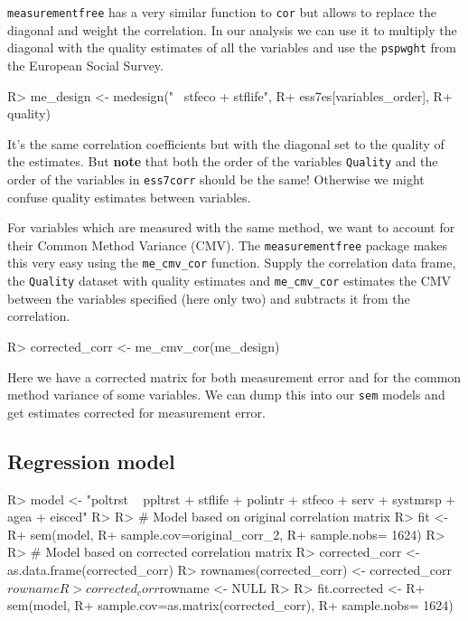 \documentclass[
]{jss}
\begin{document}
\texttt{measurementfree} has a very similar function to \texttt{cor} but
allows to replace the diagonal and weight the correlation. In our
analysis we can use it to multiply the diagonal with the quality
estimates of all the variables and use the \texttt{pspwght} from the
European Social Survey.

\begin{CodeChunk}

\begin{CodeInput}
R> me_design <- medesign("~ stfeco + stflife",
R+                       ess7es[variables_order],
R+                       quality)
\end{CodeInput}
\end{CodeChunk}

It's the same correlation coefficients but with the diagonal set to the
quality of the estimates. But \textbf{note} that both the order of the
variables \texttt{Quality} and the order of the variables in
\texttt{ess7corr} should be the same! Otherwise we might confuse quality
estimates between variables.

For variables which are measured with the same method, we want to
account for their Common Method Variance (CMV). The
\texttt{measurementfree} package makes this very easy using the
\texttt{me\_cmv\_cor} function. Supply the correlation data frame, the
\texttt{Quality} dataset with quality estimates and
\texttt{me\_cmv\_cor} estimates the CMV between the variables specified
(here only two) and subtracts it from the correlation.

\begin{CodeChunk}

\begin{CodeInput}
R> corrected_corr <- me_cmv_cor(me_design)
\end{CodeInput}
\end{CodeChunk}

Here we have a corrected matrix for both measurement error and for the
common method variance of some variables. We can dump this into our
\texttt{sem} models and get estimates corrected for measurement error.

\hypertarget{regression-model}{%
\subsection{Regression model}\label{regression-model}}

\begin{CodeChunk}

\begin{CodeInput}
R> model <- "poltrst ~ ppltrst + stflife + polintr + stfeco + serv + systmrsp + agea + eisced"
R> 
R> # Model based on original correlation matrix
R> fit <-
R+   sem(model,
R+       sample.cov=original_corr_2,
R+       sample.nobs= 1624)
R> 
R> # Model based on corrected correlation matrix
R> corrected_corr <- as.data.frame(corrected_corr)
R> rownames(corrected_corr) <- corrected_corr$rowname
R> corrected_corr$rowname <- NULL
R> 
R> fit.corrected <-
R+   sem(model,
R+       sample.cov=as.matrix(corrected_corr),
R+       sample.nobs= 1624)
\end{CodeInput}
\end{CodeChunk}
\end{document}
